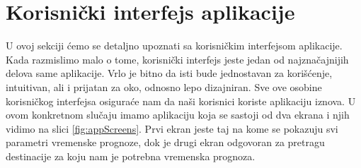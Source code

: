 \documentclass[12pt,oneside]{memoir}
\begin{document}
\section{Korisnički interfejs aplikacije}

U ovoj sekciji ćemo se detaljno upoznati sa korisničkim interfejsom aplikacije. Kada razmislimo malo o tome, korisnički interfejs jeste jedan od najznačajnijih delova same aplikacije. Vrlo je bitno da isti bude jednostavan za korišćenje, intuitivan, ali i prijatan za oko, odnosno lepo dizajniran. Sve ove osobine korisničkog interfejsa osiguraće nam da naši korisnici koriste aplikaciju iznova. U ovom konkretnom slučaju imamo aplikaciju koja se sastoji od dva ekrana i njih vidimo na slici \ref{fig:appScreens}. Prvi ekran jeste taj na kome se pokazuju svi parametri vremenske prognoze, dok je drugi ekran odgovoran za pretragu destinacije za koju nam je potrebna vremenska prognoza.
\end{document}
